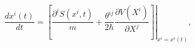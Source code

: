 \begin{equation}
\frac{dx^{i}(t)}{dt}=\left.  \left[  \frac{\partial^{i}S(x^{i},t)}{m}%
+\frac{\theta^{ij}}{2\hbar}\frac{\partial V(X^{i})}{\partial X^{j}}\right]
\right|  _{x^{i}=x^{i}(t)},\label{24}%
\end{equation}

